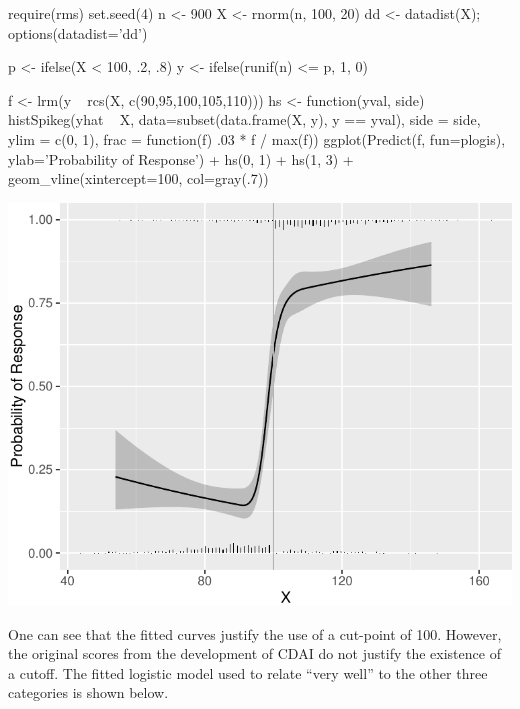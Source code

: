 \begin{Schunk}
\begin{Sinput}
require(rms)
set.seed(4)
n <- 900
X <- rnorm(n, 100, 20)
dd <- datadist(X); options(datadist='dd')

p <- ifelse(X < 100, .2, .8)
y <- ifelse(runif(n) <= p, 1, 0)

f <- lrm(y ~ rcs(X, c(90,95,100,105,110)))
hs <- function(yval, side)
  histSpikeg(yhat ~ X, data=subset(data.frame(X, y), y == yval),
             side = side, ylim = c(0, 1),
             frac = function(f) .03 * f / max(f))
ggplot(Predict(f, fun=plogis), ylab='Probability of Response') +
  hs(0, 1) + hs(1, 3) + geom_vline(xintercept=100, col=gray(.7))
\end{Sinput}


\centerline{\includegraphics{info-cutpointExists-1} }

\end{Schunk}

One can see that the fitted curves justify the use of a cut-point of
100.  However, the original scores from the development of CDAI do not
justify the existence of a cutoff.  The fitted logistic model used to
relate ``very well'' to the other three categories is shown below.


